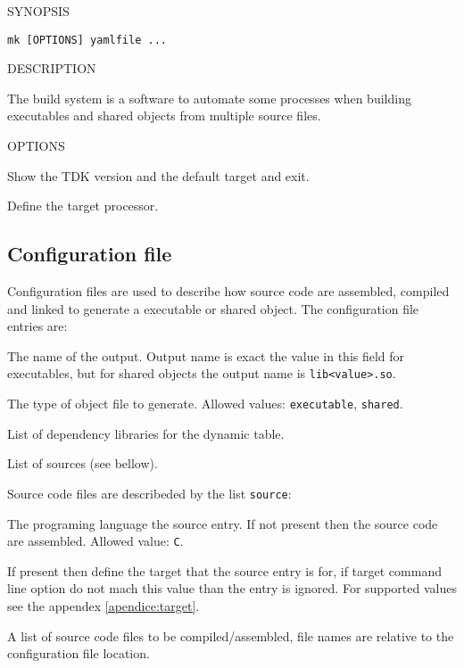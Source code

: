 \documentclass[
   article,                      %
   10pt,                         %
   openright,                    %
   oneside,                      %
   a4paper,                      %
   sumario = tradicional,        %
   english,                      %
   xcolor=table                  %
]{abntex2}
\begin{document}
\noindent SYNOPSIS

\begin{lstlisting}[style=bash]
mk [OPTIONS] yamlfile ...
\end{lstlisting}

\noindent DESCRIPTION

The build system is a software to automate some processes when building
executables and shared objects from multiple source files.

\noindent OPTIONS

\begin{description}[style=multiline,leftmargin=5cm]
   \item[\texttt{{-}{-}version}]
   Show the TDK version and the default target and exit.
   \item[\texttt{{-}{-}target <target>}]
   Define the target processor.
\end{description}

\subsection{Configuration file}

Configuration files are used to describe how source code are assembled,
compiled and linked to generate a executable or shared object.
The configuration file entries are:

\begin{description}[style=multiline,leftmargin=5cm]
   \item[\texttt{name}]
   The name of the output.
   Output name is exact the value in this field for executables,
   but for shared objects the output name is \texttt{lib<value>.so}.
   \item[\texttt{object\_type}]
   The type of object file to generate.
   Allowed values: \texttt{executable}, \texttt{shared}.
   \item[\texttt{dependencies}]
   List of dependency libraries for the dynamic table.
   \item[\texttt{source}]
   List of sources (see bellow).
\end{description}

Source code files are describeded by the list \texttt{source}:

\begin{description}[style=multiline,leftmargin=5cm]
   \item[\texttt{language}]
   The programing language the source entry.
   If not present then the source code are assembled.
   Allowed value: \texttt{C}.
   \item[\texttt{target}]
   If present then define the target that the source entry is for,
   if target command line option do not mach this value than
   the entry is ignored.
   For supported values see the appendex \ref{apendice:target}.
   \item[\texttt{files}]
   A list of source code files to be compiled/assembled,
   file names are relative to the configuration file location.
\end{description}
\end{document}
